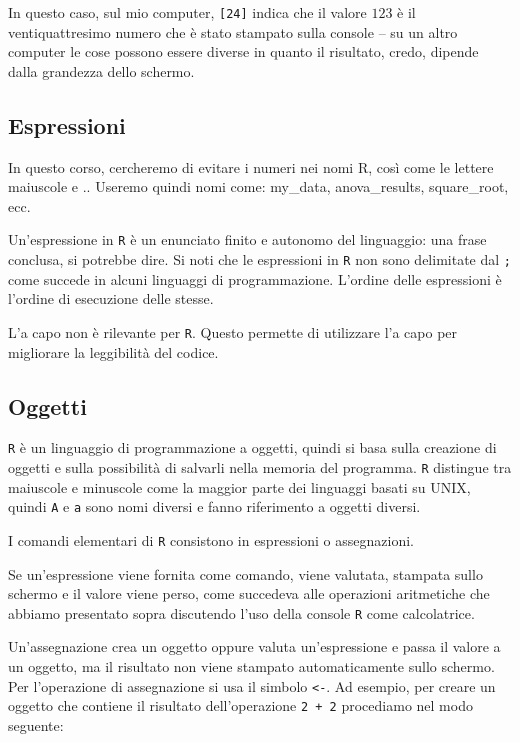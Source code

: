 \documentclass[
  11pt,
]{krantz}
\theoremstyle{definition}
\theoremstyle{definition}
\theoremstyle{definition}
\theoremstyle{definition}
\theoremstyle{remark}
\begin{document}
In questo caso, sul mio computer, \texttt{{[}24{]}} indica che il valore \(123\) è il ventiquattresimo numero che è stato stampato sulla console -- su un altro computer le cose possono essere diverse in quanto il risultato, credo, dipende dalla grandezza dello schermo.

\hypertarget{espressioni}{%
\subsection{Espressioni}\label{espressioni}}

In questo corso, cercheremo di evitare i numeri nei nomi R, così come le lettere maiuscole e .. Useremo quindi nomi come: my\_data, anova\_results, square\_root, ecc.

Un'espressione in \texttt{R} è un enunciato finito e autonomo del linguaggio: una frase conclusa, si potrebbe dire. Si noti che le espressioni in \texttt{R} non sono delimitate dal \texttt{;} come succede in alcuni linguaggi di programmazione. L'ordine delle espressioni è l'ordine di esecuzione delle stesse.

L'a capo non è rilevante per \texttt{R}. Questo permette di utilizzare l'a capo per migliorare la leggibilità del codice.

\hypertarget{oggetti}{%
\subsection{Oggetti}\label{oggetti}}

\texttt{R} è un linguaggio di programmazione a oggetti, quindi si basa sulla creazione di oggetti e sulla possibilità di salvarli nella memoria del programma. \texttt{R} distingue tra maiuscole e minuscole come la maggior parte dei linguaggi basati su UNIX, quindi \texttt{A} e \texttt{a} sono nomi diversi e fanno riferimento a oggetti diversi.

I comandi elementari di \texttt{R} consistono in espressioni o assegnazioni.

Se un'espressione viene fornita come comando, viene valutata, stampata sullo schermo e il valore viene perso, come succedeva alle operazioni aritmetiche che abbiamo presentato sopra discutendo l'uso della console \texttt{R} come calcolatrice.

Un'assegnazione crea un oggetto oppure valuta un'espressione e passa il valore a un oggetto, ma il risultato non viene stampato automaticamente sullo schermo. Per l'operazione di assegnazione si usa il simbolo \texttt{\textless{}-}. Ad esempio, per creare un oggetto che contiene il risultato dell'operazione \texttt{2\ +\ 2} procediamo nel modo seguente:
\end{document}
